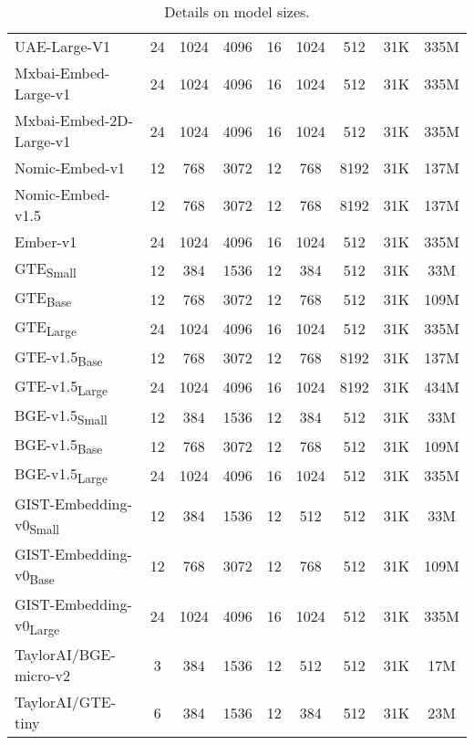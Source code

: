\begin{table*}[ht!]
\begin{tabular}{lcccccccc}
      UAE-Large-V1 & 24 & 1024 & 4096 & 16 & 1024 & 512 & 31K & 335M \\
      Mxbai-Embed-Large-v1 & 24 & 1024 & 4096 & 16 & 1024 & 512 & 31K & 335M \\
      Mxbai-Embed-2D-Large-v1 & 24 & 1024 & 4096 & 16 & 1024 & 512 & 31K & 335M \\
      Nomic-Embed-v1 & 12 & 768 & 3072 & 12 & 768 & 8192 & 31K & 137M \\
      Nomic-Embed-v1.5 & 12 & 768 & 3072 & 12 & 768 & 8192 & 31K & 137M \\
      Ember-v1 & 24 & 1024 & 4096 & 16 & 1024 & 512 & 31K & 335M \\
      GTE\textsubscript{Small} & 12 & 384 & 1536 & 12 & 384 & 512 & 31K & 33M \\
      GTE\textsubscript{Base} & 12 & 768 & 3072 & 12 & 768 & 512 & 31K & 109M \\
      GTE\textsubscript{Large} & 24 & 1024 & 4096 & 16 & 1024 & 512 & 31K & 335M \\
      GTE-v1.5\textsubscript{Base} & 12 & 768 & 3072 & 12 & 768 & 8192 & 31K & 137M \\
      GTE-v1.5\textsubscript{Large} & 24 & 1024 & 4096 & 16 & 1024 & 8192 & 31K & 434M \\
      BGE-v1.5\textsubscript{Small} & 12 & 384 & 1536 & 12 & 384 & 512 & 31K & 33M \\
      BGE-v1.5\textsubscript{Base} & 12 & 768 & 3072 & 12 & 768 & 512 & 31K & 109M \\
      BGE-v1.5\textsubscript{Large} & 24 & 1024 & 4096 & 16 & 1024 & 512 & 31K & 335M \\
      GIST-Embedding-v0\textsubscript{Small} & 12 & 384 & 1536 & 12 & 512 & 512 & 31K & 33M \\
      GIST-Embedding-v0\textsubscript{Base}  & 12 & 768 & 3072 & 12 & 768 & 512 & 31K & 109M \\
      GIST-Embedding-v0\textsubscript{Large} & 24 & 1024 & 4096 & 16 & 1024 & 512 & 31K & 335M \\
      TaylorAI/BGE-micro-v2 & 3 & 384 & 1536 & 12 & 512 & 512 & 31K & 17M \\
      TaylorAI/GTE-tiny & 6 & 384 & 1536 & 12 & 384 & 512 & 31K & 23M \\
      \bottomrule
    \end{tabular}
    \caption{Details on model sizes.}
    \label{tab:parameters}
  \end{table*}
  